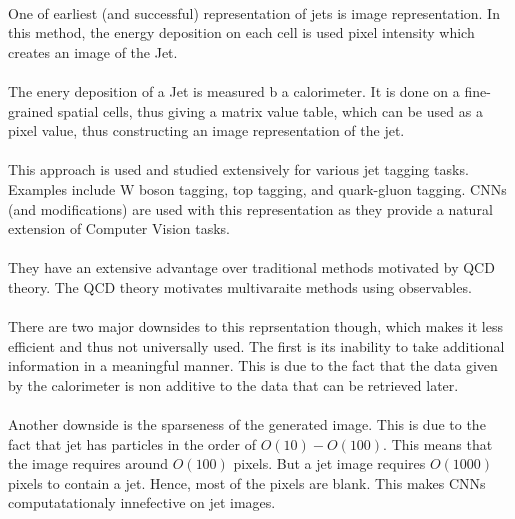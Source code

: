 \paragraph{} One of earliest (and successful) representation of jets is image representation.  In this method, the energy deposition on each cell is used pixel intensity which creates an image of the Jet.

\paragraph{} The enery deposition of a Jet is measured b a calorimeter. It is done on a fine-grained spatial cells, thus giving a matrix value table, which can be  used as a pixel value, thus constructing an image representation of the jet.

\paragraph{} This approach is used and studied extensively for various jet tagging tasks. Examples include W boson tagging, top tagging, and quark-gluon tagging.  CNNs (and modifications) are used with this representation as they provide a natural extension of Computer Vision tasks.

\paragraph{} They have an extensive advantage over traditional methods motivated by QCD theory. The QCD theory motivates multivaraite methods using observables. 

\paragraph{} There are two major downsides to this reprsentation though, which makes it less efficient and thus not universally used. The first is its inability to take additional information in a meaningful manner. This is due to the fact that the data given by the calorimeter is non additive to the data that can be retrieved later.

\paragraph{} Another downside is the sparseness of the generated image. This is due to the fact that jet has particles in the order of $O(10) - O(100)$. This means that the image requires around $O(100)$ pixels. But a jet image requires $O(1000)$ pixels to contain a jet. Hence, most of the pixels are blank. This makes CNNs computatationaly innefective on jet images.

